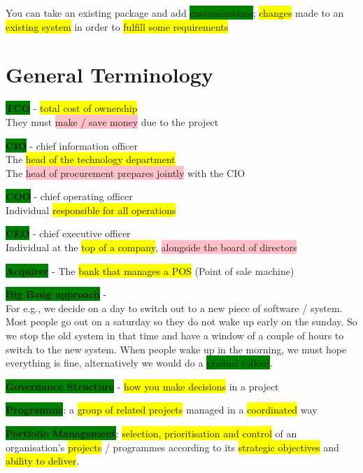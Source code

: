 \documentclass[]{project_plan}
\begin{document}
You can take an existing package and add \colorbox{green}{customizations}; \colorbox{yellow}{changes} made to an
\colorbox{yellow}{existing system} in order to \colorbox{yellow}{fulfill some requirements}

\section{General Terminology}

\colorbox{green}{\textbf{TCO}} - \colorbox{yellow}{total cost of ownership}\\
They must \colorbox{pink}{make / save money} due to the project

\colorbox{green}{\textbf{CIO}} - chief information officer\\
The \colorbox{yellow}{head of the technology department}\\
The \colorbox{pink}{head of procurement prepares jointly} with the CIO

\colorbox{green}{\textbf{COO}} - chief operating officer\\
Individual \colorbox{yellow}{responsible for all operations}

\colorbox{green}{\textbf{CEO}} - chief executive officer\\
Individual at the \colorbox{yellow}{top of a company}, \colorbox{pink}{alongside the board of directors}

\colorbox{green}{\textbf{Acquirer}} - The \colorbox{yellow}{bank that manages a POS} (Point of sale machine)

\colorbox{green}{\textbf{Big Bang approach}} - \\
For e.g., we decide on a day to switch out to a new piece of software / system.
Most people go out on a saturday so they do not wake up early on the sunday.
So we stop the old system in that time and have a window of a couple of hours to
switch to the new system. When people wake up in the morning, we must hope
everything is fine, alternatively we would do a \colorbox{green}{gradual rollout}.

\colorbox{green}{\textbf{Governance Structure}} - \colorbox{yellow}{how you make decisions} in a project

\colorbox{green}{\textbf{Programme}}: a \colorbox{yellow}{group of related projects} managed in a \colorbox{yellow}{coordinated} way

\colorbox{green}{\textbf{Portfolio Management}}: \colorbox{yellow}{selection, prioritisation and control} of an organisation's
\colorbox{yellow}{projects} / programmes according to its \colorbox{yellow}{strategic objectives} and \colorbox{yellow}{ability to deliver}.
\end{document}

